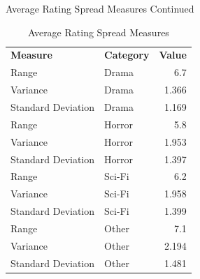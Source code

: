 \documentclass[pdf]{beamer}
\theoremstyle{remark}
\theoremstyle{definition}
\begin{document}
\begin{frame}[t]{Average Rating Spread Measures Continued}
\begin{table}[htbp]
  \centering
    \captionsetup{justification=centering}
    \begin{tabular}{llr}
    \rowcolor[rgb]{ .851,  .882,  .949} \textbf{Measure} & \textbf{Category} & \multicolumn{1}{l}{\textbf{Value}} \\
    Range & Drama & 6.7 \\
    Variance & Drama & 1.366 \\
    Standard Deviation & Drama & 1.169 \\
    Range & Horror & 5.8 \\
    Variance & Horror & 1.953 \\
    Standard Deviation & Horror & 1.397 \\
    Range & Sci-Fi & 6.2 \\
    Variance & Sci-Fi & 1.958 \\
    Standard Deviation & Sci-Fi & 1.399 \\
    Range & Other & 7.1 \\
    Variance & Other & 2.194 \\
    Standard Deviation & Other & 1.481 \\
    \end{tabular}%
  \caption{Average Rating Spread Measures} 
  \label{tab:addlabel}%
\end{table}%
\vspace{-2.0ex}

\end{frame}
\end{document}
